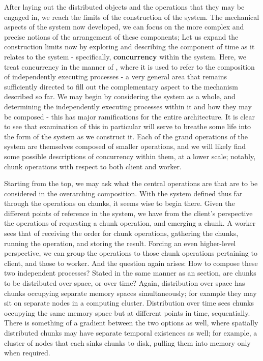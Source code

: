 After laying out the distributed objects and the operations that they may be engaged in, we reach the limits of the construction of the system.
The mechanical aspects of the system now developed, we can focus on the more complex and precise notions of the arrangement of these components; Let us expand the construction limits now by exploring and describing the component of time as it relates to the system - specifically, \textbf{concurrency} within the system.
Here, we treat concurrency in the manner of \textcite{pike2012concurrency}, where it is used to refer to the composition of independently executing processes - a very general area that remains sufficiently directed to fill out the complementary aspect to the mechanism described so far.
We may begin by considering the system as a whole, and determining the independently executing processes within it and how they may be composed - this has major ramifications for the entire architecture.
It is clear to see that examination of this in particular will serve to breathe some life into the form of the system as we construct it.
Each of the grand operations of the system are themselves composed of smaller operations, and we will likely find some possible descriptions of concurrency within them, at a lower scale; notably, chunk operations with respect to both client and worker.

Starting from the top, we may ask what the central operations are that are to be considered in the overarching composition.
With the system defined thus far through the operations on chunks, it seems wise to begin there.
Given the different points of reference in the system, we have from the client's perspective the operations of requesting a chunk operation, and emerging a chunk.
A worker sees that of receiving the order for chunk operations, gathering the chunks, running the operation, and storing the result.
Forcing an even higher-level perspective, we can group the operations to those chunk operations pertaining to client, and those to worker.
And the question again arises: How to compose these two independent processes?
Stated in the same manner as an section, are chunks to be distributed over space, or over time?
Again, distribution over space has chunks occupying separate memory spaces simultaneously; for example they may sit on separate nodes in a computing cluster.
Distribution over time sees chunks occupying the same memory space but at different points in time, sequentially.
There is something of a gradient between the two options as well, where spatially distributed chunks may have separate temporal existences as well; for example, a cluster of nodes that each sinks chunks to disk, pulling them into memory only when required.

